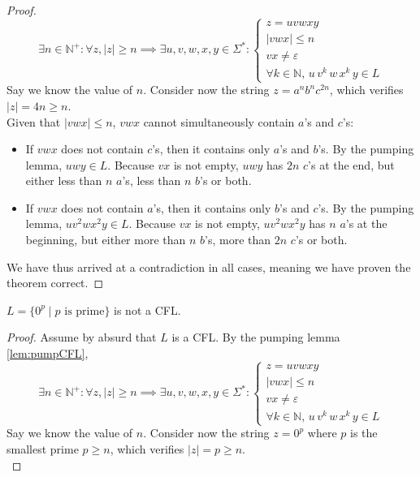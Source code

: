 \documentclass[docid=TP10]{tcom_TP}
\begin{document}
{\begin{proof}
\begin{equation*}
	\exists n \in \mathbb{N}^+ \colon \forall z, |z|\geq n \implies \exists u, v, w, x, y \in \Sigma^* \colon 
	\begin{cases}
		z=uvwxy\\
		|vwx| \leq n\\
		vx \neq \varepsilon \\
		\forall k \in \mathbb{N},\,u\,v^k\,w\,x^k\,y \in L
	\end{cases}
\end{equation*}
Say we know the value of $n$. Consider now the string $z=a^nb^nc^{2n}$, which verifies $|z|=4n \geq n$. \\
Given that $|vwx|\leq n$, $vwx$ cannot simultaneously contain $a$'s and $c$'s:
\begin{itemize}
	\item If $vwx$ does not contain $c$'s, then it contains only $a$'s and $b$'s. By the pumping lemma, $uwy \in L$. Because $vx$ is not empty, $uwy$ has $2n$ $c$'s at the end, but either less than $n$ $a$'s, less than $n$ $b$'s or both.
	\item If $vwx$ does not contain $a$'s, then it contains only $b$'s and $c$'s. By the pumping lemma, $uv^2wx^2y \in L$. Because $vx$ is not empty, $uv^2wx^2y$ has $n$ $a$'s at the beginning, but either more than $n$ $b$'s, more than $2n$ $c$'s or both.
\end{itemize}
We have thus arrived at a contradiction in all cases, meaning we have proven the theorem correct.
\end{proof}
\begin{theorem}
	$L=\{0^p\mid p \text{ is prime}\}$ is not a CFL.
\end{theorem}
\begin{proof}
Assume by absurd that $L$ is a CFL. By the pumping lemma \eqref{lem:pumpCFL},
\begin{equation*}
	\exists n \in \mathbb{N}^+ \colon \forall z, |z|\geq n \implies \exists u, v, w, x, y \in \Sigma^* \colon 
	\begin{cases}
		z=uvwxy\\
		|vwx| \leq n\\
		vx \neq \varepsilon \\
		\forall k \in \mathbb{N},\,u\,v^k\,w\,x^k\,y \in L
	\end{cases}
\end{equation*}
Say we know the value of $n$. Consider now the string $z=0^p$ where $p$ is the smallest prime $p\geq n$, which verifies $|z|=p \geq n$.\\

\end{proof}}
\end{document}
